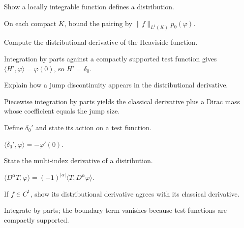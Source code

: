 \begin{problem}\label{prob:iii16-problem-02}
Show a locally integrable function defines a distribution.
\end{problem}
\begin{solution}
On each compact \(K\), bound the pairing by
\(\|f\|_{L^1(K)}p_0(\varphi)\).
\end{solution}

\begin{problem}\label{prob:iii16-problem-03}
Compute the distributional derivative of the Heaviside function.
\end{problem}
\begin{solution}
Integration by parts against a compactly supported test function gives
\(\langle H',\varphi\rangle=\varphi(0)\), so \(H'=\delta_0\).
\end{solution}

\begin{problem}\label{prob:iii16-problem-04}
Explain how a jump discontinuity appears in the distributional derivative.
\end{problem}
\begin{solution}
Piecewise integration by parts yields the classical derivative plus a Dirac
mass whose coefficient equals the jump size.
\end{solution}

\begin{problem}\label{prob:iii16-problem-05}
Define \(\delta_0'\) and state its action on a test function.
\end{problem}
\begin{solution}
\(\langle\delta_0',\varphi\rangle=-\varphi'(0)\).
\end{solution}

\begin{problem}\label{prob:iii16-problem-06}
State the multi-index derivative of a distribution.
\end{problem}
\begin{solution}
\(\langle D^\alpha T,\varphi\rangle=(-1)^{|\alpha|}
\langle T,D^\alpha\varphi\rangle\).
\end{solution}

\begin{problem}\label{prob:iii16-problem-07}
If \(f\in C^1\), show its distributional derivative agrees with its classical derivative.
\end{problem}
\begin{solution}
Integrate by parts; the boundary term vanishes because test functions are
compactly supported.
\end{solution}

